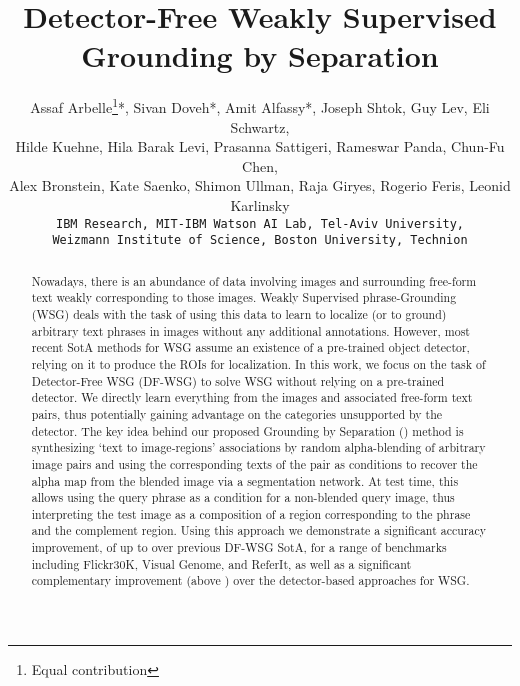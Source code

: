 \documentclass[10pt,twocolumn,letterpaper]{article}
\def\oursfull{Grounding by Separation }
\def\ourstask{DF-WSG}
\def\ourstaskfull{Detector-Free WSG }
\begin{document}
\title{
Detector-Free Weakly Supervised Grounding by Separation
}

\author{
    Assaf Arbelle\thanks{Equal contribution}\hspace{-1pt}*,
    Sivan Doveh*,
    Amit Alfassy*,
    Joseph Shtok,
    Guy Lev,
    Eli Schwartz,\\
    Hilde Kuehne,
    Hila Barak Levi,
    Prasanna Sattigeri,
    Rameswar Panda,
    Chun-Fu Chen,\\
    Alex Bronstein,
    Kate Saenko,
    Shimon Ullman,
    Raja Giryes,
    Rogerio Feris,
    Leonid Karlinsky\\
    {\tt\small IBM Research, MIT-IBM Watson AI Lab, Tel-Aviv University,} \\
    {\tt\small  Weizmann Institute of Science, Boston University, Technion}
} 
\maketitle
\ificcvfinal\thispagestyle{empty}\fi

\begin{abstract}
   Nowadays, there is an abundance of data involving images and surrounding free-form text weakly corresponding to those images. Weakly Supervised phrase-Grounding (WSG) deals with the task of using this data to learn to localize (or to ground) arbitrary text phrases in images without any additional annotations. However, most recent SotA methods for WSG assume an existence of a pre-trained object detector, relying  on it to produce the ROIs for localization.
In this work, we focus on the task of \ourstaskfull{} (\ourstask{}) to solve WSG without relying on a pre-trained detector. We directly learn everything from the images and associated free-form text pairs, thus potentially gaining advantage on the categories unsupported by the detector.
The key idea behind our proposed \oursfull{} (\ours) method is synthesizing `text to image-regions' associations by random alpha-blending of arbitrary image pairs and using the corresponding texts of the pair as conditions to recover the alpha map from the blended image via a segmentation network. At test time, this allows using the query phrase as a condition for a non-blended query image, thus interpreting the test image as a composition of a region corresponding to the phrase and the complement region. Using this approach we demonstrate a significant accuracy improvement, of up to  over previous \ourstask{} SotA, for a range of benchmarks including Flickr30K, Visual Genome, and ReferIt, as well as a significant complementary improvement (above ) over the detector-based approaches for WSG. \end{abstract}
\end{document}
